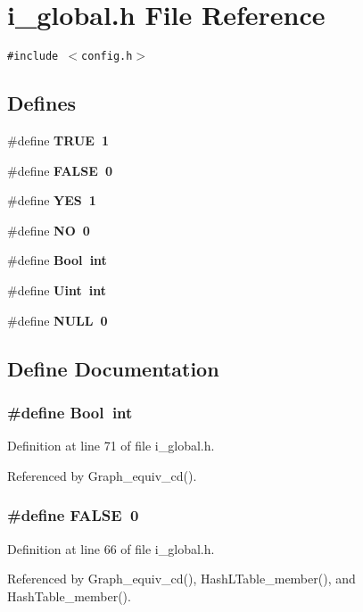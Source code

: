 \section{i\_\-global.h File Reference}
\label{i__global_8h}
{\tt \#include $<$config.h$>$}\par
\subsection*{Defines}
\begin{CompactItemize}
\item 
\#define \bf{TRUE}~1
\item 
\#define \bf{FALSE}~0
\item 
\#define \bf{YES}~1
\item 
\#define \bf{NO}~0
\item 
\#define \bf{Bool}~int
\item 
\#define \bf{Uint}~int
\item 
\#define \bf{NULL}~0
\end{CompactItemize}


\subsection{Define Documentation}
\subsubsection{\setlength{\rightskip}{0pt plus 5cm}\#define Bool~int}\label{i__global_8h_940a01ad540c9d80fdf13c9f99f84472}




Definition at line 71 of file i\_\-global.h.

Referenced by Graph\_\-equiv\_\-cd().
\subsubsection{\setlength{\rightskip}{0pt plus 5cm}\#define FALSE~0}\label{i__global_8h_a93f0eb578d23995850d61f7d61c55c1}




Definition at line 66 of file i\_\-global.h.

Referenced by Graph\_\-equiv\_\-cd(), Hash\-LTable\_\-member(), and Hash\-Table\_\-member().
